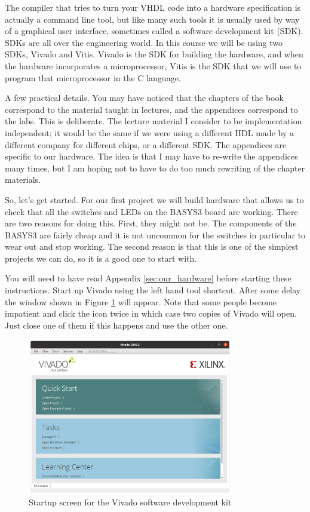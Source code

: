 \documentclass[../physical_computing.tex]{subfiles}
\begin{document}
The compiler that tries to turn your VHDL code into a hardware specification is actually a command line tool, but like many such tools it is usually used by way of a graphical user interface, sometimes called a software development kit (SDK). SDKs are all over the engineering world. In this course we will be using two SDKs, Vivado and Vitis. Vivado is the SDK for building the hardware, and when the hardware incorporates a microprocessor, Vitis is the SDK that we will use to program that microprocessor in the C language.

A few practical details. You may have noticed that the chapters of the book correspond to the material taught in lectures, and the appendices correspond to the labs. This is deliberate. The lecture material I consider to be implementation independent; it would be the same if we were using a different HDL made by a different company for different chips, or a different SDK. The appendices are specific to our hardware. The idea is that I may have to re-write the appendices many times, but I am hoping not to have to do too much rewriting of the chapter materials.

So, let's get started. For our first project we will build hardware that allows us to check that all the switches and LEDs on the BASYS3 board are working. There are two reasons for doing this. First, they might not be. The components of the BASYS3 are fairly cheap and it is not uncommon for the switches in particular to wear out and stop working. The second reason is that this is one of the simplest projects we can do, so it is a good one to start with.

You will need to have read Appendix \ref{sec:our_hardware} before starting these instructions. Start up Vivado using the left hand tool shortcut. After some delay the window shown in Figure \ref{fig:vivado_startup} will appear. Note that some people become impatient and click the icon twice in which case two copies of Vivado will open. Just close one of them if this happens and use the other one.

\begin{figure}[htbp]
    \centering
    \includegraphics[width=0.8\textwidth]{chapter_1/figures/vivado_startup.png}
    \caption{Startup screen for the Vivado software development kit}
    \label{fig:vivado_startup}
\end{figure}
\end{document}

